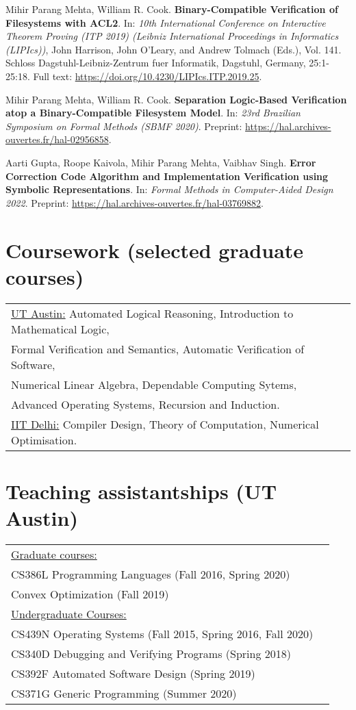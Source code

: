 \documentclass[margin]{res}
\begin{document}
\begin{resume}
  Mihir Parang Mehta, William R. Cook. {\bf Binary-Compatible
    Verification of Filesystems with ACL2}. In: \textit{10th
    International Conference on Interactive Theorem Proving (ITP 2019)
    (Leibniz International Proceedings in Informatics (LIPIcs))}, John
  Harrison, John O'Leary, and Andrew Tolmach (Eds.), Vol. 141. Schloss
  Dagstuhl-Leibniz-Zentrum fuer Informatik, Dagstuhl, Germany,
  25:1-25:18. Full text:
  \url{https://doi.org/10.4230/LIPIcs.ITP.2019.25}.

  Mihir Parang Mehta, William R. Cook. {\bf Separation Logic-Based
    Verification atop a Binary-Compatible Filesystem Model}. In:
  \textit{23rd Brazilian Symposium on Formal Methods (SBMF 2020)}. Preprint:
  \url{https://hal.archives-ouvertes.fr/hal-02956858}.

  Aarti Gupta, Roope Kaivola, Mihir Parang Mehta, Vaibhav Singh. {\bf
    Error Correction Code Algorithm and Implementation Verification
    using Symbolic Representations}. In: \textit{Formal
    Methods in Computer-Aided Design 2022}. Preprint:
  \url{https://hal.archives-ouvertes.fr/hal-03769882}.

\section{Coursework (selected graduate courses)}
\begin{tabular}{l p{3in}}
  \underline{UT Austin:} Automated Logical Reasoning, Introduction to
  Mathematical Logic, \\ Formal Verification and Semantics, Automatic
  Verification of Software,\\ Numerical Linear Algebra, Dependable
  Computing Sytems, \\Advanced Operating Systems, Recursion and Induction. \\
  \underline{IIT Delhi:} Compiler Design,
  Theory of Computation, Numerical Optimisation.
\end{tabular}

\section{Teaching assistantships (UT Austin)}
\begin{tabular}{l p{3in}}
  \underline{Graduate courses:} \\
  CS386L Programming Languages (Fall 2016, Spring 2020) \\
  Convex Optimization (Fall 2019) \\
  \underline{Undergraduate Courses:} \\
  CS439N Operating Systems (Fall 2015, Spring 2016, Fall 2020) \\
  CS340D Debugging and Verifying Programs (Spring 2018) \\
  CS392F Automated Software Design (Spring 2019) \\
  CS371G Generic Programming (Summer 2020)
\end{tabular}


\end{resume}
\end{document}
